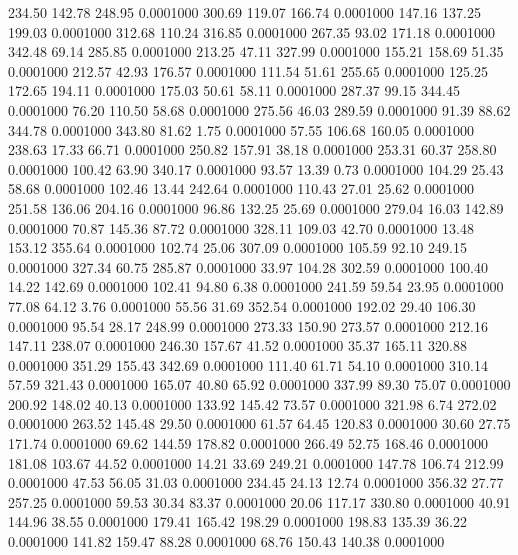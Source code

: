  234.50  142.78  248.95   0.0001000
 300.69  119.07  166.74   0.0001000
 147.16  137.25  199.03   0.0001000
 312.68  110.24  316.85   0.0001000
 267.35   93.02  171.18   0.0001000
 342.48   69.14  285.85   0.0001000
 213.25   47.11  327.99   0.0001000
 155.21  158.69   51.35   0.0001000
 212.57   42.93  176.57   0.0001000
 111.54   51.61  255.65   0.0001000
 125.25  172.65  194.11   0.0001000
 175.03   50.61   58.11   0.0001000
 287.37   99.15  344.45   0.0001000
  76.20  110.50   58.68   0.0001000
 275.56   46.03  289.59   0.0001000
  91.39   88.62  344.78   0.0001000
 343.80   81.62    1.75   0.0001000
  57.55  106.68  160.05   0.0001000
 238.63   17.33   66.71   0.0001000
 250.82  157.91   38.18   0.0001000
 253.31   60.37  258.80   0.0001000
 100.42   63.90  340.17   0.0001000
  93.57   13.39    0.73   0.0001000
 104.29   25.43   58.68   0.0001000
 102.46   13.44  242.64   0.0001000
 110.43   27.01   25.62   0.0001000
 251.58  136.06  204.16   0.0001000
  96.86  132.25   25.69   0.0001000
 279.04   16.03  142.89   0.0001000
  70.87  145.36   87.72   0.0001000
 328.11  109.03   42.70   0.0001000
  13.48  153.12  355.64   0.0001000
 102.74   25.06  307.09   0.0001000
 105.59   92.10  249.15   0.0001000
 327.34   60.75  285.87   0.0001000
  33.97  104.28  302.59   0.0001000
 100.40   14.22  142.69   0.0001000
 102.41   94.80    6.38   0.0001000
 241.59   59.54   23.95   0.0001000
  77.08   64.12    3.76   0.0001000
  55.56   31.69  352.54   0.0001000
 192.02   29.40  106.30   0.0001000
  95.54   28.17  248.99   0.0001000
 273.33  150.90  273.57   0.0001000
 212.16  147.11  238.07   0.0001000
 246.30  157.67   41.52   0.0001000
  35.37  165.11  320.88   0.0001000
 351.29  155.43  342.69   0.0001000
 111.40   61.71   54.10   0.0001000
 310.14   57.59  321.43   0.0001000
 165.07   40.80   65.92   0.0001000
 337.99   89.30   75.07   0.0001000
 200.92  148.02   40.13   0.0001000
 133.92  145.42   73.57   0.0001000
 321.98    6.74  272.02   0.0001000
 263.52  145.48   29.50   0.0001000
  61.57   64.45  120.83   0.0001000
  30.60   27.75  171.74   0.0001000
  69.62  144.59  178.82   0.0001000
 266.49   52.75  168.46   0.0001000
 181.08  103.67   44.52   0.0001000
  14.21   33.69  249.21   0.0001000
 147.78  106.74  212.99   0.0001000
  47.53   56.05   31.03   0.0001000
 234.45   24.13   12.74   0.0001000
 356.32   27.77  257.25   0.0001000
  59.53   30.34   83.37   0.0001000
  20.06  117.17  330.80   0.0001000
  40.91  144.96   38.55   0.0001000
 179.41  165.42  198.29   0.0001000
 198.83  135.39   36.22   0.0001000
 141.82  159.47   88.28   0.0001000
  68.76  150.43  140.38   0.0001000
